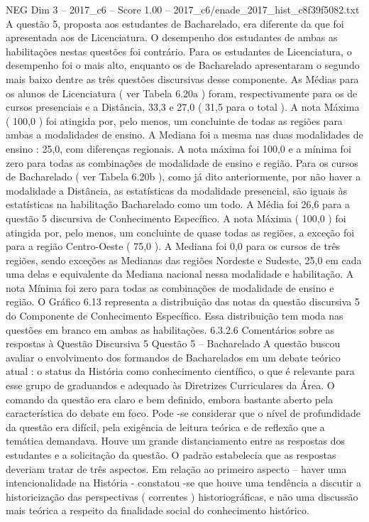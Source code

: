 \begin{textsample}{NEG Dim 3 – 2017\_c6 – Score 1.00 – 2017\_c6/enade\_2017\_hist\_c8f39f5082.txt}
A questão 5, proposta aos estudantes de Bacharelado, era diferente da que foi apresentada aos de Licenciatura.
O desempenho dos estudantes de ambas as habilitações nestas questões foi contrário.
Para os estudantes de Licenciatura, o desempenho foi o mais alto, enquanto os de Bacharelado apresentaram o segundo mais baixo dentre as três questões discursivas desse componente.
As Médias para os alunos de Licenciatura ( ver Tabela 6.20a ) foram, respectivamente para os de cursos presenciais e a Distância, 33,3 e 27,0 ( 31,5 para o total ).
A nota Máxima ( 100,0 ) foi atingida por, pelo menos, um concluinte de todas as regiões para ambas a modalidades de ensino.
A Mediana foi a mesma nas duas modalidades de ensino : 25,0, com diferenças regionais.
A nota máxima foi 100,0 e a mínima foi zero para todas as combinações de modalidade de ensino e região.
Para os cursos de Bacharelado ( ver Tabela 6.20b ), como já dito anteriormente, por não haver a modalidade a Distância, as estatísticas da modalidade presencial, são iguais às estatísticas na habilitação Bacharelado como um todo.
A Média foi 26,6 para a questão 5 discursiva de Conhecimento Específico.
A nota Máxima ( 100,0 ) foi atingida por, pelo menos, um concluinte de quase todas as regiões, a exceção foi para a região Centro-Oeste ( 75,0 ).
A Mediana foi 0,0 para os cursos de três regiões, sendo exceções as Medianas das regiões Nordeste e Sudeste, 25,0 em cada uma delas e equivalente da Mediana nacional nessa modalidade e habilitação.
A nota Mínima foi zero para todas as combinações de modalidade de ensino e região.
O Gráfico 6.13 representa a distribuição das notas da questão discursiva 5 do Componente de Conhecimento Específico.
Essa distribuição tem moda nas questões em branco em ambas as habilitações. 6.3.2.6 Comentários sobre as respostas à Questão Discursiva 5 Questão 5 – Bacharelado A questão buscou avaliar o envolvimento dos formandos de Bacharelados em um debate teórico atual : o status da História como conhecimento científico, o que é relevante para esse grupo de graduandos e adequado às Diretrizes Curriculares da Área.
O comando da questão era claro e bem definido, embora bastante aberto pela característica do debate em foco.
Pode -se considerar que o nível de profundidade da questão era difícil, pela exigência de leitura teórica e de reflexão que a temática demandava.
Houve um grande distanciamento entre as respostas dos estudantes e a solicitação da questão.
O padrão estabelecia que as respostas deveriam tratar de três aspectos.
Em relação ao primeiro aspecto – haver uma intencionalidade na História - constatou -se que houve uma tendência a discutir a historicização das perspectivas ( correntes ) historiográficas, e não uma discussão mais teórica a respeito da finalidade social do conhecimento histórico.

\end{textsample}

